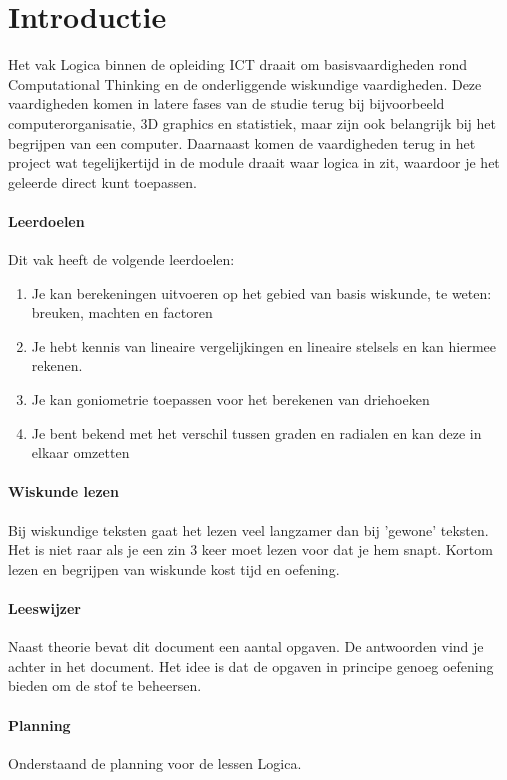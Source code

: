 \chapter{Introductie}
\label{chap:introductie}

Het vak Logica binnen de opleiding ICT draait om basisvaardigheden rond Computational Thinking en de onderliggende wiskundige vaardigheden. Deze vaardigheden komen in latere fases van de studie terug bij bijvoorbeeld computerorganisatie, 3D graphics en statistiek, maar zijn ook belangrijk bij het begrijpen van een computer. Daarnaast komen de vaardigheden terug in het project wat tegelijkertijd in de module draait waar logica in zit, waardoor je het geleerde direct kunt toepassen.

\subsubsection{Leerdoelen}
Dit vak heeft de volgende leerdoelen:
\begin{enumerate}
    \item Je kan berekeningen uitvoeren op het gebied van basis wiskunde, te weten: breuken, machten en factoren
    \item Je hebt kennis van lineaire vergelijkingen en lineaire stelsels en kan hiermee rekenen.
    \item Je kan goniometrie toepassen voor het berekenen van driehoeken 
    \item Je bent bekend met het verschil tussen graden en radialen en kan deze in elkaar omzetten
\end{enumerate}

\subsubsection{Wiskunde lezen}
Bij wiskundige teksten gaat het lezen veel langzamer  dan bij 'gewone' teksten. Het is niet raar als je een zin 3 keer moet lezen voor dat je hem snapt. Kortom lezen en begrijpen van wiskunde kost tijd en oefening. 

\subsubsection{Leeswijzer}
Naast theorie bevat dit document een aantal opgaven. De antwoorden vind je achter in het document. Het idee is dat de opgaven in principe genoeg oefening bieden om de stof te beheersen. 

\newpage
\subsubsection{Planning}
Onderstaand de planning voor de lessen Logica.

